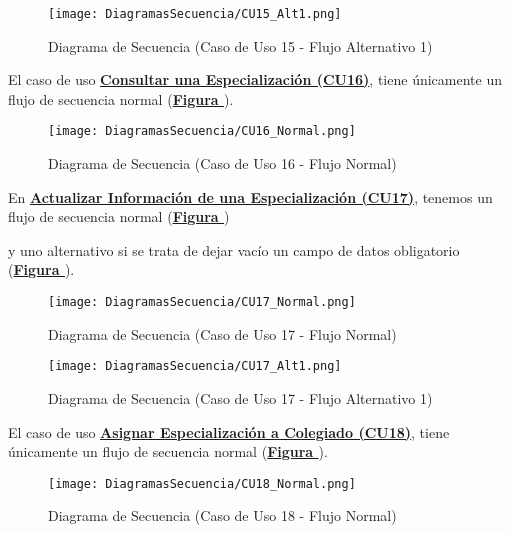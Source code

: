 \begin{figure}[!htbp]
  \centering
  \texttt{[image: DiagramasSecuencia/CU15\_Alt1.png]}
  \caption{Diagrama de Secuencia (Caso de Uso 15 - Flujo Alternativo 1)}
  \label{fig:Secuencia_CU15_Alt1}
\end{figure}
\FloatBarrier

\addtocounter{figura}{1}
El caso de uso \textbf{\hyperref[tab:curConsultarEspec]{Consultar una Especialización (CU16)}}, tiene únicamente un flujo de secuencia normal (\textbf{\hyperref[fig:Secuencia_CU16_Normal]{Figura }}).
\begin{figure}[!htbp]
  \centering
  \texttt{[image: DiagramasSecuencia/CU16\_Normal.png]}
  \caption{Diagrama de Secuencia (Caso de Uso 16 - Flujo Normal)}
  \label{fig:Secuencia_CU16_Normal}
\end{figure}
\FloatBarrier

\addtocounter{figura}{1} \pagebreak
En \textbf{\hyperref[tab:curActualizarEspec]{Actualizar Información de una Especialización (CU17)}}, tenemos un flujo de secuencia normal (\textbf{\hyperref[fig:Secuencia_CU17_Normal]{Figura }}) \addtocounter{figura}{1} y uno alternativo si se trata de dejar vacío un campo de datos obligatorio (\textbf{\hyperref[fig:Secuencia_CU17_Alt1]{Figura }}).
\begin{figure}[!htbp]
  \centering
  \texttt{[image: DiagramasSecuencia/CU17\_Normal.png]}
  \caption{Diagrama de Secuencia (Caso de Uso 17 - Flujo Normal)}
  \label{fig:Secuencia_CU17_Normal}
\end{figure}
\FloatBarrier

\begin{figure}[!htbp]
  \centering
  \texttt{[image: DiagramasSecuencia/CU17\_Alt1.png]}
  \caption{Diagrama de Secuencia (Caso de Uso 17 - Flujo Alternativo 1)}
  \label{fig:Secuencia_CU17_Alt1}
\end{figure}
\FloatBarrier

\addtocounter{figura}{1} \pagebreak
El caso de uso \textbf{\hyperref[tab:curAsignarEspecColeg]{Asignar Especialización a Colegiado (CU18)}}, tiene únicamente un flujo de secuencia normal (\textbf{\hyperref[fig:Secuencia_CU18_Normal]{Figura }}).
\begin{figure}[!htbp]
  \centering
  \texttt{[image: DiagramasSecuencia/CU18\_Normal.png]}
  \caption{Diagrama de Secuencia (Caso de Uso 18 - Flujo Normal)}
  \label{fig:Secuencia_CU18_Normal}
\end{figure}
\FloatBarrier

